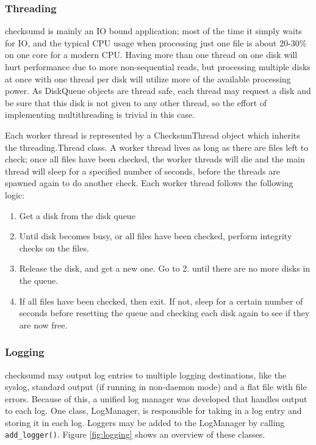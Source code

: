 \subsubsection{Threading}
checksumd is mainly an IO bound application; most of the time it simply waits for IO, and the typical CPU usage when processing just one file is about 20-30\% on one core for a modern CPU. Having more than one thread on one disk will hurt performance due to more non-sequential reads, but processing multiple disks at once with one thread per disk will utilize more of the available processing power. As DiskQueue objects are thread safe, each thread may request a disk and be sure that this disk is not given to any other thread, so the effort of implementing multithreading is trivial in this case.

Each worker thread is represented by a ChecksumThread object which inherits the threading.Thread class. A worker thread lives as long as there are files left to check; once all files have been checked, the worker threads will die and the main thread will sleep for a specified number of seconds, before the threads are spawned again to do another check. Each worker thread follows the following logic:
\begin{enumerate}
\item Get a disk from the disk queue
\item Until disk becomes busy, or all files have been checked, perform integrity checks on the files.
\item Release the disk, and get a new one. Go to 2. until there are no more disks in the queue.
\item If all files have been checked, then exit. If not, sleep for a certain number of seconds before resetting the queue and checking each disk again to see if they are now free.
\end{enumerate}

\subsubsection{Logging}
checksumd may output log entries to multiple logging destinations, like the syslog, standard output (if running in non-daemon mode) and a flat file with file errors. Because of this, a unified log manager was developed that handles output to each log. One class, LogManager, is responsible for taking in a log entry and storing it in each log. Loggers may be added to the LogManager by calling {\tt add\_logger()}. Figure \ref{fig:logging} shows an overview of these classes.

